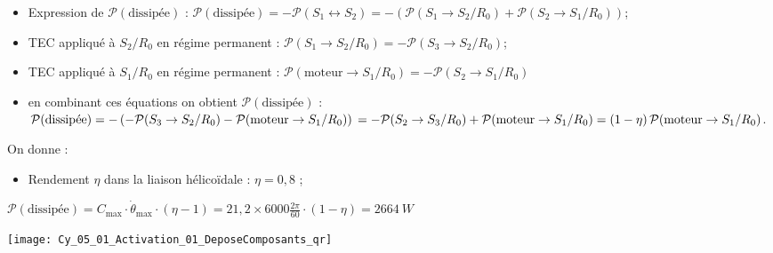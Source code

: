 \ifprof\begin{corrige}
\begin{itemize}
\item Expression de $\mathcal{P}(\text{dissipée})$ :
$\mathcal{P}(\text{dissipée})=-\mathcal{P}(S_1\leftrightarrow S_2)=-\left(\mathcal{P}(S_1\to S_2/R_0)+\mathcal{P}(S_2\to S_1/R_0)\right)$;
\item TEC appliqué à $S_2/R_0$ en régime permanent : 
$\mathcal{P}(S_1\to S_2/R_0)=-\mathcal{P}(S_3\to S_2/R_0)$;

\item TEC appliqué à $S_1/R_0$ en régime permanent :
$\mathcal{P}(\text{moteur}\to S_1/R_0)=-\mathcal{P}(S_2\to S_1/R_0)$
\item en combinant ces équations on obtient $\mathcal{P}(\text{dissipée})$ : 
$\mathcal{P}(\text{dissipée})=-\left(-\mathcal{P}(S_3\to S_2/R_0)-\mathcal{P}(\text{moteur}\to S_1/R_0)\right)\\
=-\mathcal{P}(S_2\to S_3/R_0)+\mathcal{P}(\text{moteur}\to S_1/R_0)=\left(1-\eta\right)\mathcal{P}(\text{moteur}\to S_1/R_0)$.
\end{itemize}
\end{corrige}\else\fi

\vspace{.5cm}
On donne : 
\begin{itemize}
\item Rendement $\eta$ dans la liaison hélicoïdale : $\eta=0,8$ ; 
\end{itemize}


\ifprof\begin{corrige}
$
\mathcal{P}(\text{dissipée})=C_{\text{max}}\cdot \dot{\theta}_{\text{max}}\cdot \left(\eta-1\right)
=21,2\times6000\frac{2\pi}{60}\cdot \left(1-\eta\right)=\SI{2664}{W}
$
\end{corrige}\else\fi

\ifprof
\else
\begin{marginfigure}
\centering
\texttt{[image: Cy\_05\_01\_Activation\_01\_DeposeComposants\_qr]}
\end{marginfigure}
\fi

